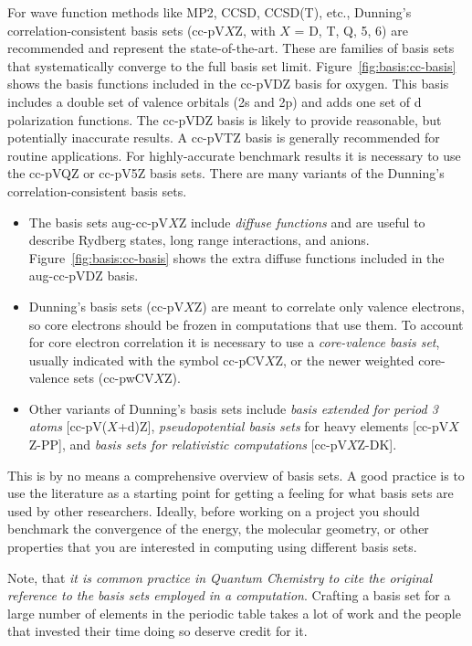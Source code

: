\documentclass[../Main/notes.tex]{subfiles}
\begin{document}
For wave function methods like MP2, CCSD, CCSD(T), etc., Dunning's  correlation-consistent basis sets (cc-pV$X$Z, with $X$ = D, T, Q, 5, 6) are recommended and represent the state-of-the-art.
These are families of basis sets that systematically converge to the full basis set limit.
Figure~\ref{fig:basis:cc-basis} shows the basis functions included in the cc-pVDZ basis for oxygen.
This basis includes a double set of valence orbitals (2s and 2p) and adds one set of d polarization functions.
The cc-pVDZ basis is likely to provide reasonable, but potentially inaccurate results. A cc-pVTZ basis is generally recommended for routine applications. 
For highly-accurate benchmark results it is necessary to use the cc-pVQZ or cc-pV5Z basis sets.
There are many variants of the Dunning's  correlation-consistent basis sets.
\begin{itemize}
\item The basis sets aug-cc-pV$X$Z include \emph{diffuse functions} and are useful to describe Rydberg states, long range interactions, and anions.
Figure~\ref{fig:basis:cc-basis} shows the extra diffuse functions included in the aug-cc-pVDZ basis.

\item Dunning's basis sets (cc-pV$X$Z) are meant to correlate only valence electrons, so core electrons should be frozen in computations that use them.
To account for core electron correlation it is necessary to use a \emph{core-valence basis set}, usually indicated with the symbol cc-pCV$X$Z, or the newer weighted core-valence sets (cc-pwCV$X$Z). 

\item Other variants of Dunning's basis sets include \emph{basis extended for period 3 atoms} [cc-pV($X$+d)Z], \emph{pseudopotential basis sets} for heavy elements [cc-pV$X$Z-PP], and \emph{basis sets for relativistic computations} [cc-pV$X$Z-DK].
\end{itemize}

This is by no means a comprehensive overview of basis sets.
A good practice is to use the literature as a starting point for getting a feeling for what basis sets are used by other researchers.
Ideally, before working on a project you should benchmark the convergence of the energy, the molecular geometry, or other properties that you are interested in computing using different basis sets.

Note, that \emph{it is common practice in Quantum Chemistry to cite the original reference to the basis sets employed in a computation}. Crafting a basis set for a large number of elements in the periodic table takes a lot of work and the people that invested their time doing so deserve credit for it.
\end{document}
